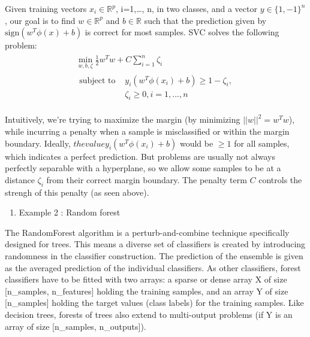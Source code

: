 \documentclass[10pt,a4paper]{article}
\providecommand{\tightlist}{%
  \setlength{\parskip}{0pt}
  }
\theoremstyle{break}
\begin{document}
Given training vectors \(x_i \in \mathbb{R}^p\), i=1,\ldots{}, n, in two classes, and a vector \(y \in \{1, -1\}^n\)
, our goal is to find \(w \in \mathbb{R}^p\) and \(b \in \mathbb{R}\) such that the prediction given by \(\text{sign} (w^T\phi(x) + b)\) is correct for most samples.
SVC solves the following problem:
\begin{align}\begin{aligned}\min_ {w, b, \zeta} \frac{1}{2} w^T w + C \sum_{i=1}^{n} \zeta_i\\\begin{split}\textrm {subject to } & y_i (w^T \phi (x_i) + b) \geq 1 - \zeta_i,\\
& \zeta_i \geq 0, i=1, ..., n\end{split}\end{aligned}\end{align}

Intuitively, we're trying to maximize the margin (by minimizing \(||w||^2 = w^Tw\)), while incurring a penalty when a sample is misclassified or within the margin boundary. Ideally, \(the value y_i (w^T \phi (x_i) + b)\) would be \(\geq 1\) for all samples, which indicates a perfect prediction. But problems are usually not always perfectly separable with a hyperplane, so we allow some samples to be at a distance \(\zeta_i\) from their correct margin boundary. The penalty term \(C\) controls the strengh of this penalty (as seen above).

\begin{enumerate}
\def\labelenumi{\arabic{enumi}.}
\setcounter{enumi}{1}
\tightlist
\item
  Example 2 : Random forest
\end{enumerate}

The RandomForest algorithm is a perturb-and-combine technique specifically designed for trees. This means a diverse set of classifiers is created by introducing randomness in the classifier construction. The prediction of the ensemble is given as the averaged prediction of the individual classifiers. As other classifiers, forest classifiers have to be fitted with two arrays: a sparse or dense array X of size {[}n\_samples, n\_features{]} holding the training samples, and an array Y of size {[}n\_samples{]} holding the target values (class labels) for the training samples. Like decision trees, forests of trees also extend to multi-output problems (if Y is an array of size {[}n\_samples, n\_outputs{]}).
\end{document}
